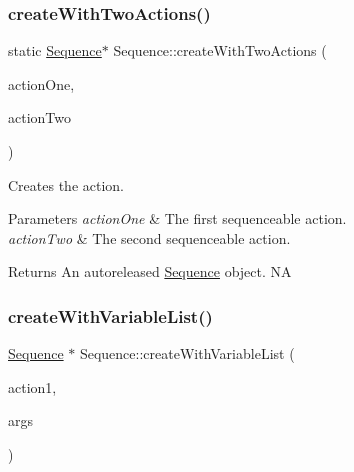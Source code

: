 \subsubsection{\texorpdfstring{create\+With\+Two\+Actions()}{createWithTwoActions()}\hspace{0.1cm}{\footnotesize\ttfamily [2/2]}}
{\footnotesize\ttfamily static \hyperlink{classSequence}{Sequence}$\ast$ Sequence\+::create\+With\+Two\+Actions (\begin{DoxyParamCaption}\item[{\hyperlink{classFiniteTimeAction}{Finite\+Time\+Action} $\ast$}]{action\+One,  }\item[{\hyperlink{classFiniteTimeAction}{Finite\+Time\+Action} $\ast$}]{action\+Two }\end{DoxyParamCaption})\hspace{0.3cm}{\ttfamily [static]}}

Creates the action. 
\begin{DoxyParams}{Parameters}
{\em action\+One} & The first sequenceable action. \\
\hline
{\em action\+Two} & The second sequenceable action. \\
\hline
\end{DoxyParams}
\begin{DoxyReturn}{Returns}
An autoreleased \hyperlink{classSequence}{Sequence} object.  NA 
\end{DoxyReturn}
\mbox{\label{classSequence_a7604201e2d9e58bdf1125defc27a1987}} 
\subsubsection{\texorpdfstring{create\+With\+Variable\+List()}{createWithVariableList()}\hspace{0.1cm}{\footnotesize\ttfamily [1/2]}}
{\footnotesize\ttfamily \hyperlink{classSequence}{Sequence} $\ast$ Sequence\+::create\+With\+Variable\+List (\begin{DoxyParamCaption}\item[{\hyperlink{classFiniteTimeAction}{Finite\+Time\+Action} $\ast$}]{action1,  }\item[{va\+\_\+list}]{args }\end{DoxyParamCaption})\hspace{0.3cm}{\ttfamily [static]}}

